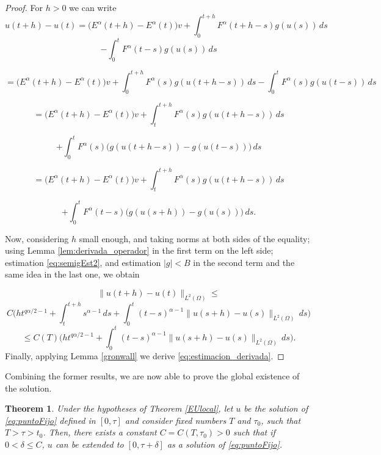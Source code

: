 \documentclass{amsart}
\newcommand{\ele}{L^2(\Omega)}
\newcommand{\fmonio}{g}
\newtheorem{theorem}{Theorem}[section]
\theoremstyle{remark}
\theoremstyle{definition}
\numberwithin{equation}{section}
\begin{document}
\begin{proof}


For $h>0$ we can write
\begin{equation}
\label{eq:est_derivada2}
u(t+h) - u(t) = \big(E^{\alpha}(t+h)-E^{\alpha}(t)\big)v + \int^{t+h}_0F^{\alpha}(t+h-s)\fmonio(u(s)) \, ds  
\end{equation}
$$- \int^{t}_0 F^{\alpha}(t-s)\fmonio(u(s)) \, ds$$

$$= \big(E^{\alpha}(t+h)-E^{\alpha}(t)\big)v + \int^{t+h}_0F^{\alpha}(s)\fmonio(u(t+h-s)) \, ds - \int^{t}_0 F^{\alpha}(s)\fmonio(u(t-s)) \, ds$$


$$
=  \big(E^{\alpha}(t+h)-E^{\alpha}(t)\big)v + \int^{t+h}_t F^{\alpha}(s)\fmonio(u(t+h-s)) \, ds  
$$

$$
+ \int^{t}_0 F^{\alpha}(s) \big( \fmonio(u(t+h-s)) - \fmonio(u(t-s)) \big) \, ds
$$

$$
=  \big(E^{\alpha}(t+h)-E^{\alpha}(t)\big)v + \int^{t+h}_t F^{\alpha}(s)\fmonio(u(t+h-s)) \, ds $$

$$
+ \int^{t}_0 F^{\alpha}(t-s) \big( \fmonio(u(s+h)) - \fmonio(u(s)) \big) \, ds.
$$

Now, considering $h$ small enough, and taking norms at both sides of the equality; using Lemma \ref{lem:derivada_operador} in the first term on the left side; estimation \eqref{eq:semigEst2}, and estimation $|\fmonio|<B$ in the second term and the same idea in the last one, we obtain

$$\|u(t+h) - u(t)\|_{\ele} \leq $$
$$
C\Big( h t^{q\alpha/2 - 1} + \int^{t+h}_{t} s^{\alpha-1} \, ds + \int^{t}_{0} (t-s)^{\alpha-1}\|u(s+h) - u(s)\|_{\ele} \, ds \Big)
$$
\begin{equation}
\label{eq:est_derivada3}
\leq C(T)\Big( h t^{q\alpha/2 - 1} + \int^{t}_{0} (t-s)^{\alpha-1}\|u(s+h) - u(s)\|_{\ele} \, ds \Big).
\end{equation}
Finally, applying Lemma \ref{gronwall} we derive \eqref{eq:estimacion_derivada}.      
			
\end{proof}

Combining the former results, we are now able to prove the global existence of the solution.
  
                
\begin{theorem}
\label{teo_ex_global}
Under the hypotheses of Theorem \ref{EUlocal}, let  $u$ be the solution of \eqref{eq:puntoFijo} defined in $[0,\tau]$ and consider fixed numbers $T$ and $\tau_0$, such that $T>\tau>t_0$.  Then, there exists a constant $C = C(T, \tau_0) >0$ such that if $0<\delta \leq C$, $u$ can be extended to $[0,\tau + \delta]$ as a solution of \eqref{eq:puntoFijo}.   
\end{theorem}
\end{document}
